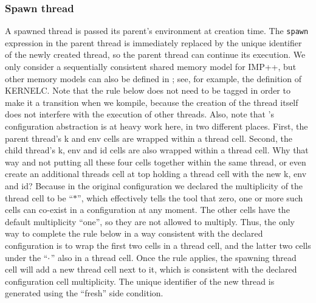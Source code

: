 \documentclass{article}
\begin{document}
\begin{kdefinition}
\begin{module}{}
\begin{kblock}[text]
 \subsubsection{Spawn thread}
A spawned thread is passed its parent's environment at creation time.
The \texttt{spawn} expression in the parent thread is immediately
replaced by the unique identifier of the newly created thread, so the
parent thread can continue its execution.  We only consider a sequentially
consistent shared memory model for IMP++, but other memory models can also
be defined in \K; see, for example, the definition of KERNELC\@.  Note that
the rule below does not need to be tagged in order to make it a transition
when we kompile, because the creation of the thread itself does not interfere
with the execution of other threads.  Also, note that \K's configuration
abstraction is at heavy work here, in two different places.  First, the
parent thread's \textsf{k} and \textsf{env} cells are wrapped within a
\textsf{thread} cell.  Second, the child thread's \textsf{k}, \textsf{env}
and \textsf{id} cells are also wrapped within a \textsf{thread} cell.  Why
that way and not putting all these four cells together within the
same thread, or even create an additional \textsf{threads} cell at top
holding a \textsf{thread} cell with the new \textsf{k}, \textsf{env}
and \textsf{id}?  Because in the original configuration we declared
the multiplicity of the \textsf{thread} cell to be ``$*$'', which
effectively tells the \K tool that zero, one or more such cells can
co-exist in a configuration at any moment.  The other cells have the
default multiplicity ``one'', so they are not allowed to multiply.
Thus, the only way to complete the rule below in a way consistent with
the declared configuration is to wrap the first two cells in a
\textsf{thread} cell, and the latter two cells under the ``$\cdot$''
also in a \textsf{thread} cell.  Once the rule applies, the spawning
thread cell will add a new thread cell next to it, which is consistent
with the declared configuration cell multiplicity.  The unique identifier
of the new thread is generated using the ``fresh'' side condition. \end{kblock}
\begin{kblock}[text]

\end{kblock}
\end{module}
\end{kdefinition}
\end{document}
